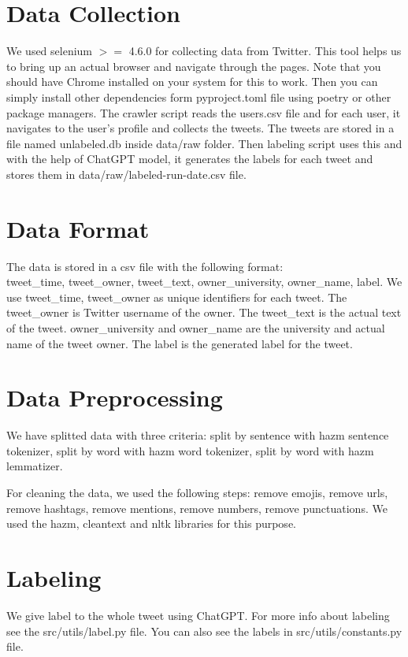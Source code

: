 \documentclass[12pt, letterpaper]{article}
\begin{document}
    \section{Data Collection}\label{sec:data-collection}
    We used selenium $>=$ 4.6.0 for collecting data from Twitter. This tool helps us to bring up an actual browser and navigate through the pages. Note that you should have Chrome installed on your system for this to work. Then you can simply install other dependencies form pyproject.toml file using poetry or other package managers.
    The crawler script reads the users.csv file and for each user, it navigates to the user's profile and collects the tweets. The tweets are stored in a file named unlabeled.db inside data\slash raw folder. Then labeling script uses this and with the help of ChatGPT model, it generates the labels for each tweet and stores them in data\slash raw\slash labeled-run-date.csv file.


    \section{Data Format}\label{sec:data-format}
    The data is stored in a csv file with the following format:\\ tweet\_time, tweet\_owner, tweet\_text, owner\_university, owner\_name, label.
    We use tweet\_time, tweet\_owner as unique identifiers for each tweet. The tweet\_owner is Twitter username of the owner. The tweet\_text is the actual text of the tweet. owner\_university and owner\_name are the university and actual name of the tweet owner. The label is the generated label for the tweet.


    \section{Data Preprocessing}\label{sec:data-preprocessing}
    We have splitted data with three criteria: split by sentence with hazm sentence tokenizer, split by word with hazm word tokenizer, split by word with hazm lemmatizer.

    For cleaning the data, we used the following steps: remove emojis, remove urls, remove hashtags, remove mentions, remove numbers, remove punctuations. We used the hazm, cleantext and nltk libraries for this purpose.


    \section{Labeling}\label{sec:labeling}
    We give label to the whole tweet using ChatGPT. For more info about labeling see the src\slash utils\slash label.py file. You can also see the labels in src\slash utils\slash constants.py file.
\end{document}
